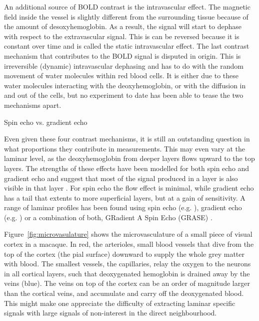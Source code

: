 An additional source of BOLD contrast is the intravascular effect. The magnetic field inside the vessel is slightly different from the surrounding tissue because of the amount of desoxyhemoglobin. As a result, the signal will start to dephase with respect to the extravascular signal. This is can be reversed because it is constant over time and is called the static intravascular effect. The last contrast mechanism that contributes to the BOLD signal is disputed in origin. This is irreversible (dynamic) intravascular dephasing and has to do with the random movement of water molecules within red blood cells. It is either due to these water molecules interacting with the deoxyhemoglobin, or with the diffusion in and out of the cells, but no experiment to date has been able to tease the two mechanisms apart.

Spin echo vs. gradient echo

Even given these four contrast mechanisms, it is still an outstanding question in what proportions they contribute in measurements. This may even vary at the laminar level, as the deoxyhemoglobin from deeper layers flows upward to the top layers. The strengths of these effects have been modelled for both spin echo and gradient echo and suggest that most of the signal produced in a layer is also visible in that layer \cite{Markuerkiaga2016,Uludag2017}. For spin echo the flow effect is minimal, while gradient echo has a tail that extents to more superficial layers, but at a gain of sensitivity. A range of laminar profiles has been found using spin echo (e.g. \cite{Zhao2004,Harel2006,Goense2006}), gradient echo (e.g. \cite{Polimeni2010,DeMartino2013,Chen2013}) or a combination of both, GRadient A Spin Echo (GRASE) \cite{Olman2012,DeMartino2013}.

Figure~\ref{fig:microvasulature} shows the microvasculature of a small piece of visual cortex in a macaque. In red, the arterioles, small blood vessels that dive from the top of the cortex (the pial surface) downward to supply the whole grey matter with blood. The smallest vessels, the capillaries, relay the oxygen to the neurons in all cortical layers, such that deoxygenated hemoglobin is drained away by the veins (blue). The veins on top of the cortex can be an order of magnitude larger than the cortical veins, and accumulate and carry off the deoxygenated blood. This might make one appreciate the difficulty of extracting laminar specific signals with large signals of non-interest in the direct neighbourhood.



